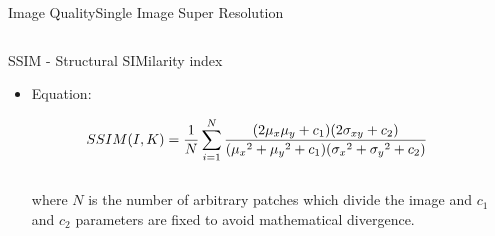 \documentclass[10pt, unicode]{beamer}
\begin{document}
\begin{frame}{Image Quality}{Single Image Super Resolution}
\begin{columns}
\begin{column}{0.65\textwidth}
\begin{alertblock}{SSIM - Structural SIMilarity index}
\begin{itemize}
          \item Equation:

          \begin{equation*}
          \hspace{-0.75cm}
          SSIM(I, K) = \frac{1}{N}\sum_{i=1}^{N} \frac{(2\mu_x\mu_y + c_1)(2\sigma_{xy} + c_2)}{ ({\mu_x}^2 + {\mu_y}^2 + c_1)({\sigma_x}^2 + {\sigma_y}^2 + c_2) }
          \end{equation*}
          \\
          where $N$ is the number of arbitrary patches which divide the image and $c_1$ and $c_2$ parameters are fixed to avoid mathematical divergence.

        \end{itemize}
      \end{alertblock}

    \end{column}

  \end{columns}

\end{frame}
\end{document}
